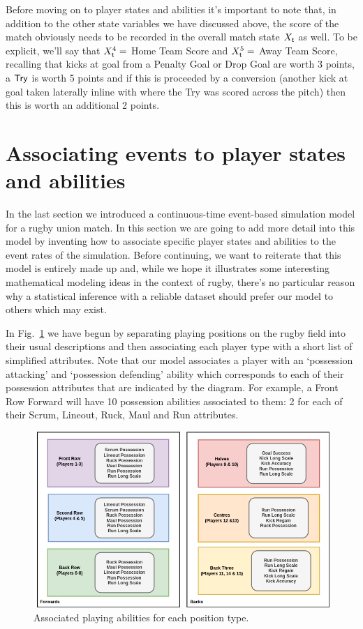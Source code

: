 Before moving on to player states and abilities it's important to note that, in addition to the other state variables we have discussed above, the score of the match obviously needs to be recorded in the overall match state $X_{\sf t}$ as well. To be explicit, we'll say that $X^4_{\sf t}=$ {\sf Home Team Score} and $X^5_{\sf t}=$ {\sf Away Team Score}, recalling that kicks at goal from a {\sf Penalty Goal} or {\sf Drop Goal} are worth 3 points, a ${\sf Try}$ is worth 5 points and if this is proceeded by a conversion (another kick at goal taken laterally inline with where the {\sf Try} was scored across the pitch) then this is worth an additional 2 points.

\section{\sffamily Associating events to player states and abilities}

In the last section we introduced a continuous-time event-based simulation model for a rugby union match. In this section we are going to add more detail into this model by inventing how to associate specific player states and abilities to the event rates of the simulation. Before continuing, we want to reiterate that this model is entirely made up and, while we hope it illustrates some interesting mathematical modeling ideas in the context of rugby, there's no particular reason why a statistical inference with a reliable dataset should prefer our model to others which may exist.

In Fig.~\ref{fig:player-abilities} we have begun by separating playing positions on the rugby field into their usual descriptions and then associating each player type with a short list of simplified attributes. Note that our model associates a player with an `possession attacking' and `possession defending' ability which corresponds to each of their possession attributes that are indicated by the diagram. For example, a Front Row Forward will have 10 possession abilities associated to them: 2 for each of their {\sf Scrum}, {\sf Lineout}, {\sf Ruck}, {\sf Maul} and {\sf Run} attributes.

\begin{figure}[h]
\includegraphics[width=15cm]{images/chapter-11-rugby-player-abilities.drawio.png}
\caption{Associated playing abilities for each position type.}
\label{fig:player-abilities}
\end{figure}

